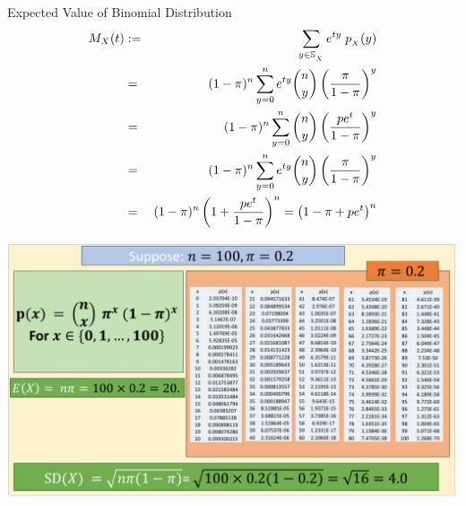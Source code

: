 \documentclass[compress]{beamer}
\begin{document}
\begin{frame}{Expected Value of Binomial Distribution}
\begin{eqnarray}
M_X(t)& := &  \sum_{y\in \support[X]} e^{ty}\; \pmf_{_X}(y) \nonumber\\
& =& (1-\binP)^{n}  \sum_{y=0}^{n}  e^{ty} {n\choose y}\left( \frac{\binP}{1-\binP}\right)^y   \nonumber\\
& =& (1-\binP)^{n}  \sum_{y=0}^{n}  {n\choose y}\left( \frac{pe^{t}}{1-\binP}\right)^y   \nonumber\\
& =& (1-\binP)^{n}  \sum_{y=0}^{n}  e^{ty} {n\choose y}\left( \frac{\binP}{1-\binP}\right)^y   \nonumber\\
& =& (1-\binP)^{n} \left( 1+  \frac{pe^t}{1-\binP} \right)^n = \left( 1-\binP+pe^t\right)^n  \nonumber\\
\end{eqnarray}



\end{frame}


\begin{frame}
\vspace{-.1in}
\begin{center}
\includegraphics[scale=.45]{figs/BinomialExpectedValue.png}
\end{center}
\vspace{1in}
\end{frame}
\end{document}
